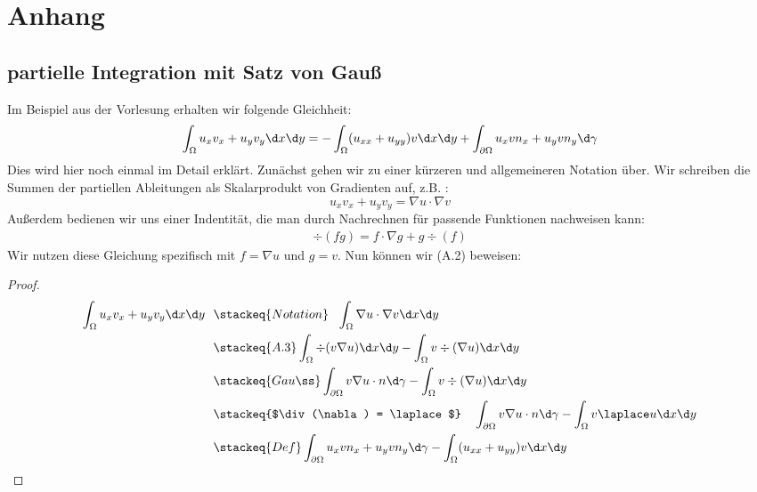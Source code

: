 \setcounter{chapter}{0}
\renewcommand{\thechapter}{\Alph{chapter}}
\chapter{Anhang}
\setcounter{equation}{1}
\section{partielle Integration mit Satz von Gauß}
Im Beispiel aus der Vorlesung erhalten wir folgende Gleichheit:
\begin{align}
	\int_{\Omega} u_xv_x + u_yv_y \d x\d y = -\int_{\Omega} (u_{xx} + u_{yy})v\d x\d y + \int_{\partial\Omega} u_x v n_x + u_y v n_y \d\gamma
\end{align}
Dies wird hier noch einmal im Detail erklärt.
\enter
Zunächst gehen wir zu einer kürzeren und allgemeineren Notation über. Wir schreiben die Summen der partiellen Ableitungen als Skalarprodukt von Gradienten auf, z.B. :
\[u_xv_x + u_yv_y = \nabla u \cdot \nabla v\]
Außerdem bedienen wir uns einer Indentität, die man durch Nachrechnen für passende Funktionen nachweisen kann:
\begin{align}\div(fg) = f \cdot \nabla g + g \div(f)\end{align}
Wir nutzen diese Gleichung spezifisch mit $f=\nabla u$ und $g=v$.
Nun können wir (A.2) beweisen:
\begin{proof}
\begin{align*}
	\int_{\Omega} u_xv_x + u_yv_y \d x\d y ~~ &\stackeq{Notation} ~~ \int_{\Omega} \nabla u \cdot \nabla v \d x\d y \\
																		 &\stackeq{A.3} \int_{\Omega}\div(v\nabla u) \d x\d y - \int_{\Omega} v \div(\nabla u) \d x\d y \\
																		 &\stackeq{Gauß} \int_{\partial\Omega}v \nabla u \cdot n \d\gamma - \int_{\Omega} v \div(\nabla u) \d x\d y \\
																		 &\stackeq{$\div(\nabla) = \laplace$} ~~~ \int_{\partial\Omega}v \nabla u \cdot n \d\gamma - \int_{\Omega} v \laplace u \d x\d y \\
																		 &\stackeq{Def} \int_{\partial\Omega} u_x v n_x + u_y v n_y \d\gamma - \int_{\Omega} (u_{xx} + u_{yy})v\d x\d y 
\end{align*}
\end{proof}
